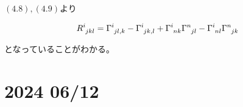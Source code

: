 \documentclass[dvipdfmx]{report} %
\begin{document}
$(4.8), (4.9)$より
\begin{tcolorbox}[title=リーマンテンソル]
\begin{equation*}
\begin{split}
\tensor{R}{^i_{jkl}} = \tensor{\Gamma}{^i_{jl,k}} - \tensor{\Gamma}{^i_{jk,l}} + \tensor{\Gamma}{^i_{nk}}\tensor{\Gamma}{^n_{jl}} - \tensor{\Gamma}{^i_{nl}}\tensor{\Gamma}{^n_{jk}}
\end{split}
\end{equation*}
\end{tcolorbox}\noindent
となっていることがわかる。

\chapter{2024 06/12}
\end{document}
